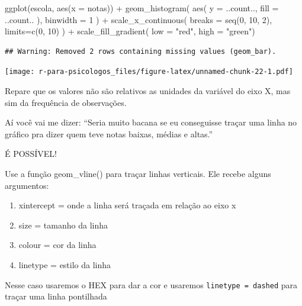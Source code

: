 \documentclass[
]{book}
\newenvironment{Shaded}{\begin{snugshade}}{\end{snugshade}}
\newcommand{\AttributeTok}[1]{\textcolor[rgb]{0.77,0.63,0.00}{#1}}
\newcommand{\DecValTok}[1]{\textcolor[rgb]{0.00,0.00,0.81}{#1}}
\newcommand{\FunctionTok}[1]{\textcolor[rgb]{0.00,0.00,0.00}{#1}}
\newcommand{\NormalTok}[1]{#1}
\newcommand{\SpecialCharTok}[1]{\textcolor[rgb]{0.00,0.00,0.00}{#1}}
\newcommand{\StringTok}[1]{\textcolor[rgb]{0.31,0.60,0.02}{#1}}
\providecommand{\tightlist}{%
  \setlength{\itemsep}{0pt}\setlength{\parskip}{0pt}}
\begin{document}
\begin{Shaded}
\begin{Highlighting}[]
\FunctionTok{ggplot}\NormalTok{(escola, }\FunctionTok{aes}\NormalTok{(}\AttributeTok{x =}\NormalTok{ notas)) }\SpecialCharTok{+} 
  \FunctionTok{geom\_histogram}\NormalTok{(}
    \FunctionTok{aes}\NormalTok{(}
      \AttributeTok{y =}\NormalTok{ ..count..,}
      \AttributeTok{fill =}\NormalTok{ ..count..}
\NormalTok{      ),}
    \AttributeTok{binwidth =} \DecValTok{1}
\NormalTok{  ) }\SpecialCharTok{+}
  \FunctionTok{scale\_x\_continuous}\NormalTok{(}
    \AttributeTok{breaks =} \FunctionTok{seq}\NormalTok{(}\DecValTok{0}\NormalTok{, }\DecValTok{10}\NormalTok{, }\DecValTok{2}\NormalTok{),}
    \AttributeTok{limits=}\FunctionTok{c}\NormalTok{(}\DecValTok{0}\NormalTok{, }\DecValTok{10}\NormalTok{)}
\NormalTok{  ) }\SpecialCharTok{+}
  \FunctionTok{scale\_fill\_gradient}\NormalTok{(}
    \AttributeTok{low =} \StringTok{"red"}\NormalTok{,}
    \AttributeTok{high =} \StringTok{"green"}\NormalTok{)}
\end{Highlighting}
\end{Shaded}

\begin{verbatim}
## Warning: Removed 2 rows containing missing values (geom_bar).
\end{verbatim}

\texttt{[image: r-para-psicologos\_files/figure-latex/unnamed-chunk-22-1.pdf]}

Repare que os valores não são relativos as unidades da variável do eixo X, mas sim da frequência de observações.

Aí você vai me dizer: ``Seria muito bacana se eu conseguisse traçar uma linha no gráfico pra dizer quem teve notas baixas, médias e altas.''

É POSSÍVEL!

Use a função geom\_vline() para traçar linhas verticais. Ele recebe alguns argumentos:

\begin{enumerate}
\def\labelenumi{\arabic{enumi}.}
\tightlist
\item
  xintercept = onde a linha será traçada em relação ao eixo x
\item
  size = tamanho da linha
\item
  colour = cor da linha
\item
  linetype = estilo da linha
\end{enumerate}

Nesse caso usaremos o HEX para dar a cor e usaremos \texttt{linetype\ =\ \textquotesingle{}dashed\textquotesingle{}} para traçar uma linha pontilhada
\end{document}
